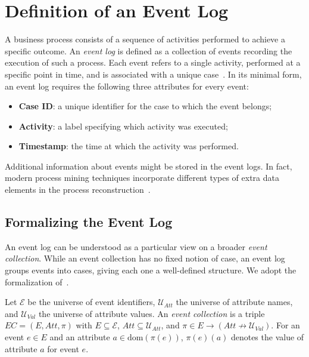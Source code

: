 \section{Definition of an Event Log} 
A business process consists of a sequence of activities performed to achieve a specific outcome. An \emph{event log} is defined as a collection of events recording the
execution of such a process. Each event refers to a single activity, performed at a specific point in time, and is associated with a unique case~\cite{reinkemeyer2020nutshell}. 
In its minimal form, an event log requires the following three attributes for every event:
	\begin{itemize}[leftmargin=*]
		\item \textbf{Case ID}: a unique identifier for the case to which the event belongs;
		\item \textbf{Activity}: a label specifying which activity was
		executed;
		\item \textbf{Timestamp}: the time at which the activity was
		performed.
	\end{itemize}

Additional information about events might be stored in the event logs. In fact, modern process mining techniques incorporate different types of extra data elements in the process reconstruction~\cite{aalst2012opportunities}.

\subsection{Formalizing the Event Log}
\label{subsec:event-log-formal}

An event log can be understood as a particular view on a broader
\emph{event collection}. While an event collection has no fixed notion of
case, an event log groups events into cases, giving each one a well-defined
structure. We adopt the formalization of~\cite{aalst2018reconstruction}.

\begin{definition}
	\label{def:event-collection}
	Let $\mathcal{E}$ be the universe of event identifiers, $\mathcal{U}_{Att}$
	the universe of attribute names, and $\mathcal{U}_{Val}$ the universe of
	attribute values. An \emph{event collection} is a triple
	$EC = (E, Att, \pi)$ with $E \subseteq \mathcal{E}$,
	$Att \subseteq \mathcal{U}_{Att}$, and
	$\pi \in E \to (Att \not\to \mathcal{U}_{Val})$. For an event $e \in E$ and
	an attribute $a \in \mathrm{dom}(\pi(e))$, $\pi(e)(a)$ denotes the value of
	attribute $a$ for event $e$.
\end{definition}

